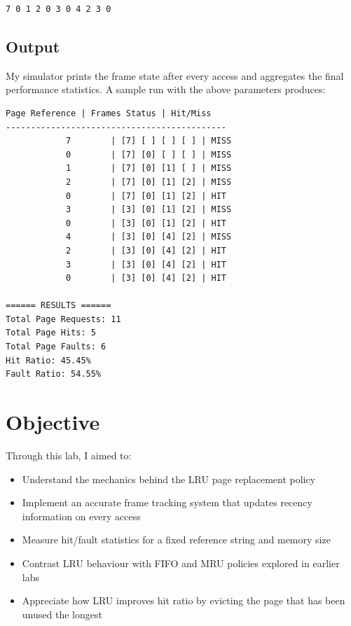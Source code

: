 \documentclass[12pt,a4paper]{article}
\begin{document}
\begin{verbatim}
7 0 1 2 0 3 0 4 2 3 0
\end{verbatim}

\subsection*{Output}
My simulator prints the frame state after every access and aggregates the final performance statistics. A sample run with the above parameters produces:
\begin{verbatim}
Page Reference | Frames Status | Hit/Miss
--------------------------------------------
			7        | [7] [ ] [ ] [ ] | MISS
			0        | [7] [0] [ ] [ ] | MISS
			1        | [7] [0] [1] [ ] | MISS
			2        | [7] [0] [1] [2] | MISS
			0        | [7] [0] [1] [2] | HIT
			3        | [3] [0] [1] [2] | MISS
			0        | [3] [0] [1] [2] | HIT
			4        | [3] [0] [4] [2] | MISS
			2        | [3] [0] [4] [2] | HIT
			3        | [3] [0] [4] [2] | HIT
			0        | [3] [0] [4] [2] | HIT

====== RESULTS ======
Total Page Requests: 11
Total Page Hits: 5
Total Page Faults: 6
Hit Ratio: 45.45%
Fault Ratio: 54.55%
\end{verbatim}

\section{Objective}
Through this lab, I aimed to:
\begin{itemize}
		\item Understand the mechanics behind the LRU page replacement policy
		\item Implement an accurate frame tracking system that updates recency information on every access
		\item Measure hit/fault statistics for a fixed reference string and memory size
		\item Contrast LRU behaviour with FIFO and MRU policies explored in earlier labs
		\item Appreciate how LRU improves hit ratio by evicting the page that has been unused the longest
\end{itemize}
\end{document}
